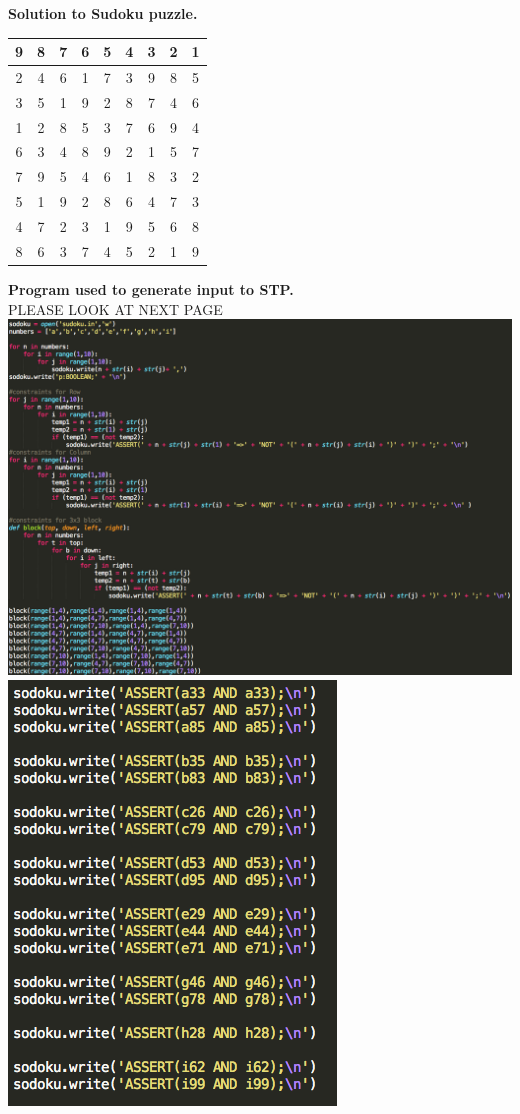 \documentclass[11pt]{article}
\begin{document}
\noindent
\textbf{Solution to Sudoku puzzle.}

\begin{tabular}{||c|c|c||c|c|c||c|c|c||}
\hline
\hline
9&8&7 &6&5&4 &3&2&1\\
\hline
2&4&6 &1&7&3 &9&8&5\\
\hline
3&5&1 &9&2&8 &7&4&6\\
\hline
\hline
1&2&8 &5&3&7 &6&9&4\\
\hline
6&3&4 &8&9&2 &1&5&7\\
\hline
7&9&5 &4&6&1 &8&3&2\\
\hline
\hline
5&1&9 &2&8&6 &4&7&3\\
\hline
4&7&2 &3&1&9 &5&6&8\\
\hline
8&6&3 &7&4&5 &2&1&9\\
\hline
\hline
\end{tabular}
\bigskip

\noindent
\textbf{Program used to generate input to STP.}\\
PLEASE LOOK AT NEXT PAGE \\
\includegraphics[scale=0.46]{5_1.PNG}\\
\includegraphics[scale=0.5]{5_2.PNG}
\end{document}
